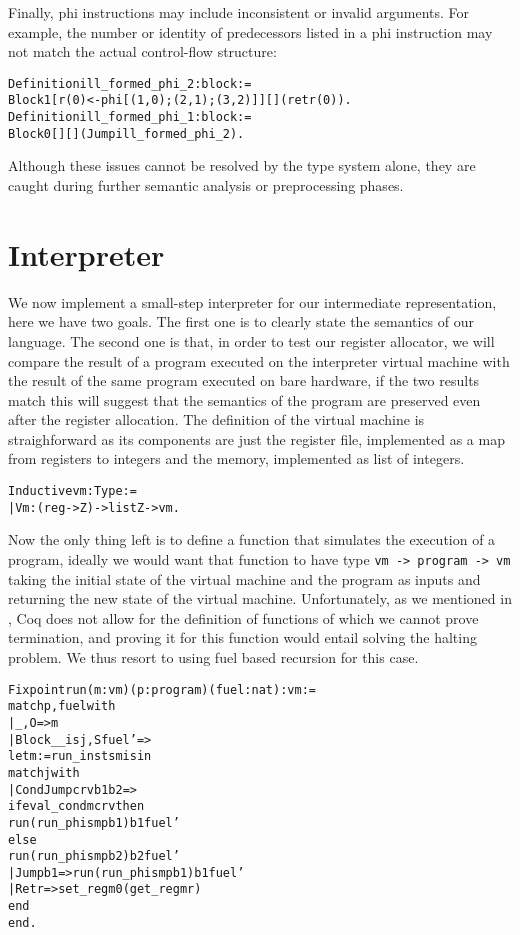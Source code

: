 Finally, phi instructions may include inconsistent or invalid arguments. For example, the number or identity of predecessors listed in a phi instruction may not match the actual control-flow structure:

\begin{alltt}
Definition ill_formed_phi_2 : block :=
  Block 1 [r(0) <- phi [(1, 0); (2, 1); (3, 2)]] [] (ret r(0)).
Definition ill_formed_phi_1 : block :=
  Block 0 [] [] (Jump ill_formed_phi_2).
\end{alltt}

Although these issues cannot be resolved by the type system alone, they are caught during further semantic analysis or preprocessing phases.

\section{Interpreter}

We now implement a small-step interpreter for our intermediate representation, here we have two goals.
The first one is to clearly state the semantics of our language. The second one is that, in order to test our register allocator, we will compare the result of a program executed on the interpreter virtual machine with the result of the same program executed on bare hardware, if the two results match this will suggest that the semantics of the program are preserved even after the register allocation.
The definition of the virtual machine is straighforward as its components are just the register file, implemented as a map from registers to integers and the memory, implemented as list of integers.

\begin{alltt}
Inductive vm : Type :=
  | Vm : (reg -> Z) -> list Z -> vm.
\end{alltt}

Now the only thing left is to define a function that simulates the execution of a program, ideally we would want that function to have type \texttt{vm -> program -> vm} taking the initial state of the virtual machine and the program as inputs and returning the new state of the virtual machine.
Unfortunately, as we mentioned in , Coq does not allow for the definition of functions of which we cannot prove termination, and proving it for this function would entail solving the halting problem. We thus resort to using fuel based recursion for this case.

\begin{alltt}
Fixpoint run (m : vm) (p : program) (fuel : nat) : vm :=
  match p, fuel with
  | _, O => m
  | Block _ _ is j, S fuel' =>
    let m := run_insts m is in
    match j with
    | CondJump c r v b1 b2 =>
      if eval_cond m c r v then
        run (run_phis m p b1) b1 fuel'
      else
        run (run_phis m p b2) b2 fuel'
    | Jump b1 => run (run_phis m p b1) b1 fuel'
    | Ret r => set_reg m 0 (get_reg m r)
    end
  end.
\end{alltt}

